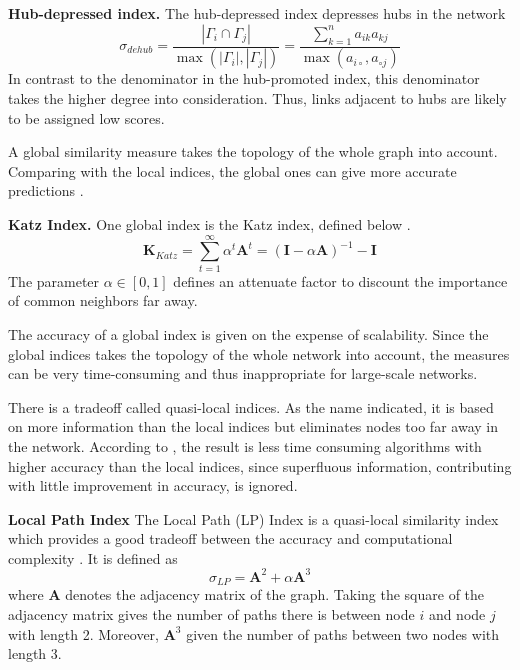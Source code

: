 \textbf{Hub-depressed index.} The hub-depressed index depresses hubs in the network \citep{fouss2016algorithms}
\begin{equation}
    \label{dehub}
    \sigma_{dehub} = \frac{|\Gamma_i \cap \Gamma_j|}{\max(|\Gamma_i|,|\Gamma_j|)} = \frac{\sum_{k=1}^n a_{ik}a_{kj}}{\max(a_{i \circ },a_{\circ j})}
\end{equation}
In contrast to the denominator in the hub-promoted index, this denominator takes the higher degree into consideration. Thus, links adjacent to hubs are likely to be assigned low scores. 

\begin{comment}
\textbf{Adamic index.} 
\begin{equation}
    \label{adamic}
    \sigma_{Adamic} = \frac{|\Gamma_i \cap \Gamma_j|}{\log(|\Gamma_i|,|\Gamma_j|)} = \frac{\sum_{k=1}^n a_{ik}a_{kj}}{\max(a_{i \circ },a_{\circ j})}
\end{equation}
\end{comment}

A global similarity measure takes the topology of the whole graph into account. Comparing with the local indices, the global ones can give more accurate predictions \citep{lu2011}.

\textbf{Katz Index.} One global index is the Katz index, defined below \citep{fouss2016algorithms}.
\begin{equation}
    \textbf{K}_{Katz}=\sum_{t=1}^{\infty} \alpha^t \textbf{A}^t = (\textbf{I}-\alpha \textbf{A})^{-1}-\textbf{I}
\end{equation}
The parameter $\alpha \in [0,1]$ defines an attenuate factor to discount the importance of common neighbors far away. 

The accuracy of a global index is given on the expense of scalability. Since the global indices takes the topology of the whole network into account, the measures can be very time-consuming and thus inappropriate for large-scale networks. 

There is a tradeoff called quasi-local indices. As the name indicated, it is based on more information than the local indices but eliminates nodes too far away in the network. According to \citet{lu2011}, the result is less time consuming algorithms with higher accuracy than the local indices, since superfluous information, contributing with little improvement in accuracy, is ignored.

\textbf{Local Path Index} The Local Path (LP) Index is a quasi-local similarity index which provides a good tradeoff between the accuracy and computational complexity \citep{lu2011}. It is defined as 
\begin{equation}
    \label{lp}
    \sigma_{LP} = \textbf{A}^2+\alpha \textbf{A}^3
\end{equation}
where $\textbf{A}$ denotes the adjacency matrix of the graph. Taking the square of the adjacency matrix gives the number of paths there is between node $i$ and node $j$ with length 2. Moreover, $\textbf{A}^3$ given the number of paths between two nodes with length 3. 

